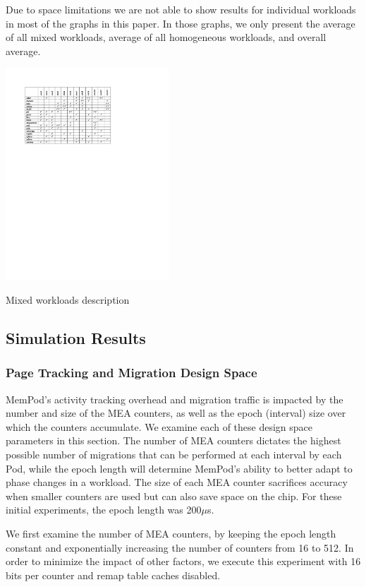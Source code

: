 Due to space limitations we are not able to show results for individual workloads in most of the graphs in this paper. In those graphs, we only present the average of all mixed workloads, average of all homogeneous workloads, and overall average.

\begin{table}
  \includegraphics[width=0.46\textwidth]{figures/workloads_checkmarks.pdf}
  \caption{Mixed workloads description}
  \label{tab:workloads}
\end{table}

\subsection{Simulation Results}
\label{sub:SimResults}

\subsubsection{Page Tracking and Migration Design Space}

MemPod's activity tracking overhead and migration traffic is impacted by
the number and size of the MEA counters, as well as the epoch (interval) 
size over
which the counters accumulate.  We examine each of these design space
parameters in this section.
The number of MEA counters dictates the highest possible number of 
migrations that can be performed at each interval by each Pod, while the epoch length will determine MemPod's ability to better adapt to phase changes in a workload. The size of each MEA counter sacrifices accuracy when smaller counters are used 
but can also save space on the chip.  For these initial experiments,
the epoch length was 200$\mu$s. 

We first examine the number of MEA counters, by keeping the epoch length constant and exponentially increasing the number of counters from 16 to 512. In order to minimize the impact of other factors, we execute this experiment with 16 bits per counter and remap table caches disabled. 

